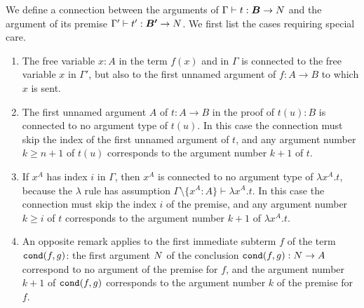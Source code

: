 %
%


We define a connection between the arguments of $\Gamma \vdash t:\vec{B} 
\rightarrow \N$ and the argument of its premise $\Gamma' \vdash t':\vec{B'} 
\rightarrow \N$. We first list the cases requiring special care.
\begin{enumerate}
\item
The free variable $x:A$ in the term $f(x)$ and in 
$\Gamma$ is connected to the free variable $x$ in $\Gamma'$, but also to the first 
unnamed argument of $f:A \rightarrow B$ to which $x$ is sent.
\item
The first unnamed argument $A$ of $t:A \rightarrow B$ in the proof of $t(u):B$ is connected to no argument type of $t(u)$.
In this case the connection must skip the index of the first unnamed argument of 
$t$, and any argument number $k \ge n+1$ of $t(u)$ corresponds to the argument 
number $k+1$ of $t$. 
\item
If $x^A$ has index $i$ in $\Gamma$, then $x^A$ is connected 
to no argument type of $\lambda x^A.t$, because the $\lambda$ rule
has assumption $\Gamma \setminus \{x^A:A\} \vdash \lambda x^A.t$.
In this case the connection must skip the index $i$ of the premise,
and any argument number $k \ge i $ of $t$ 
corresponds to the argument number $k+1$ of $ \lambda x^A.t$. 
\item
An opposite remark applies to the first immediate subterm $f$ of the
term ${\tt cond}(f,g)$:  the first argument ${N}$ of the conclusion 
${\tt cond}(f,g):{N} \rightarrow A$ correspond to no argument of the premise for $f$, 
and the argument number $k+1$ of ${\tt cond}(f,g)$ corresponds to the argument 
number $k$ of the premise for $f$. 
\end{enumerate}

